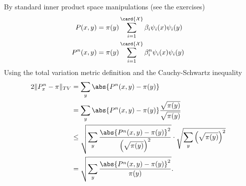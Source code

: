 \documentclass[12pt]{article}
\begin{document}
By standard inner product space manipulations (see the exercises)
\begin{align*}
    P(x,y) &= \pi(y) \sum\limits_{i=1}^{\card{\mathcal{X}}} \beta_i \psi_i
    (x) \psi_i(y) \\
    P^n(x,y) &= \pi(y) \sum\limits_{i=1}^{\card{\mathcal{X}}} \beta_i^n
    \psi_i(x) \psi_i(y) \\
\end{align*}
Using the total variation metric definition and the Cauchy-Schwartz
inequality
\begin{align*}
    2\|P^n_x - \pi\|_{TV} &= \sum\limits_y \abs{P^n(x,y) - \pi(y) } \\
    &= \sum\limits_y \abs{P^n(x,y) - \pi(y) } \frac{\sqrt{\pi(y)}}{\sqrt
    {\pi(y)}}\\
    &\le \sqrt{\sum_y \frac{\abs{P^n(x,y) - \pi(y) }^2}{\left( \sqrt{\pi
    (y)} \right)^2}} \cdot \sqrt{\sum_y \left( \sqrt{\pi(y)} \right)^2}
    \\
    &= \sqrt{\sum_y \frac{\abs{P^n(x,y) - \pi(y)}^2}{\pi(y)} }.
\end{align*}
\end{document}

